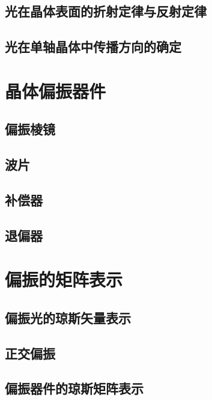 \documentclass[cn,10pt,chinesefont=founder,math=mtpro2,cite=super,toc=onecol,twoside]{elegantbook}
\begin{document}
\subsection{光在晶体表面的折射定律与反射定律}

\subsection{光在单轴晶体中传播方向的确定}

\section{晶体偏振器件}

\subsection{偏振棱镜}

\subsection{波片}

\subsection{补偿器}

\subsection{退偏器}

\section{偏振的矩阵表示}

\subsection{偏振光的琼斯矢量表示}

\subsection{正交偏振}

\subsection{偏振器件的琼斯矩阵表示}
\end{document}
